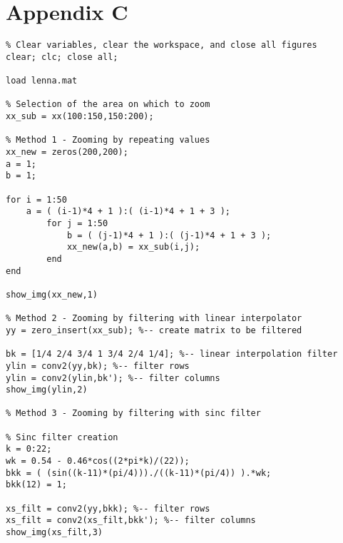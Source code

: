 \documentclass{article}
\begin{document}
\section{Appendix C}
\begin{lstlisting}
% Clear variables, clear the workspace, and close all figures
clear; clc; close all;

load lenna.mat

% Selection of the area on which to zoom
xx_sub = xx(100:150,150:200);

% Method 1 - Zooming by repeating values
xx_new = zeros(200,200);
a = 1;
b = 1;

for i = 1:50
	a = ( (i-1)*4 + 1 ):( (i-1)*4 + 1 + 3 );
		for j = 1:50
			b = ( (j-1)*4 + 1 ):( (j-1)*4 + 1 + 3 );
			xx_new(a,b) = xx_sub(i,j);
		end
end

show_img(xx_new,1)

% Method 2 - Zooming by filtering with linear interpolator
yy = zero_insert(xx_sub); %-- create matrix to be filtered

bk = [1/4 2/4 3/4 1 3/4 2/4 1/4]; %-- linear interpolation filter
ylin = conv2(yy,bk); %-- filter rows
ylin = conv2(ylin,bk'); %-- filter columns
show_img(ylin,2)

% Method 3 - Zooming by filtering with sinc filter

% Sinc filter creation
k = 0:22;
wk = 0.54 - 0.46*cos((2*pi*k)/(22));
bkk = ( (sin((k-11)*(pi/4)))./((k-11)*(pi/4)) ).*wk;
bkk(12) = 1;

xs_filt = conv2(yy,bkk); %-- filter rows
xs_filt = conv2(xs_filt,bkk'); %-- filter columns
show_img(xs_filt,3)
\end{lstlisting}
\end{document}
